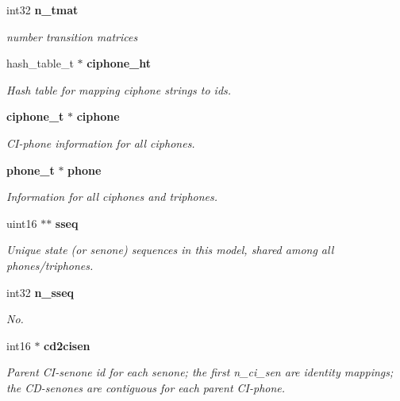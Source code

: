 \begin{DoxyCompactItemize}
int32 \textbf{ n\+\_\+tmat}
\begin{DoxyCompactList}\small\item\em number transition matrices \end{DoxyCompactList}\item 
\mbox{\label{structmdef__t_a1091b9f34193255ccf6038d75523187b}} 
hash\+\_\+table\+\_\+t $\ast$ \textbf{ ciphone\+\_\+ht}
\begin{DoxyCompactList}\small\item\em Hash table for mapping ciphone strings to ids. \end{DoxyCompactList}\item 
\mbox{\label{structmdef__t_aae4a51202b87f71394b6c5b3138b77c7}} 
\textbf{ ciphone\+\_\+t} $\ast$ \textbf{ ciphone}
\begin{DoxyCompactList}\small\item\em C\+I-\/phone information for all ciphones. \end{DoxyCompactList}\item 
\mbox{\label{structmdef__t_a2b9aaf78e5648fe14655d1fe8da5f164}} 
\textbf{ phone\+\_\+t} $\ast$ \textbf{ phone}
\begin{DoxyCompactList}\small\item\em Information for all ciphones and triphones. \end{DoxyCompactList}\item 
\mbox{\label{structmdef__t_a2472170a66d451d2d4873a9a6e64adc7}} 
uint16 $\ast$$\ast$ \textbf{ sseq}
\begin{DoxyCompactList}\small\item\em Unique state (or senone) sequences in this model, shared among all phones/triphones. \end{DoxyCompactList}\item 
int32 \textbf{ n\+\_\+sseq}
\begin{DoxyCompactList}\small\item\em No. \end{DoxyCompactList}\item 
\mbox{\label{structmdef__t_ae2ba90b39a79603022daae3c9270a0b7}} 
int16 $\ast$ \textbf{ cd2cisen}
\begin{DoxyCompactList}\small\item\em Parent C\+I-\/senone id for each senone; the first n\+\_\+ci\+\_\+sen are identity mappings; the C\+D-\/senones are contiguous for each parent C\+I-\/phone. \end{DoxyCompactList}\item 
\mbox{\label{structmdef__t_a4aafd791a1e1adaa9b5b28bf0cfbd624}} 
$$
\end{DoxyCompactItemize}
